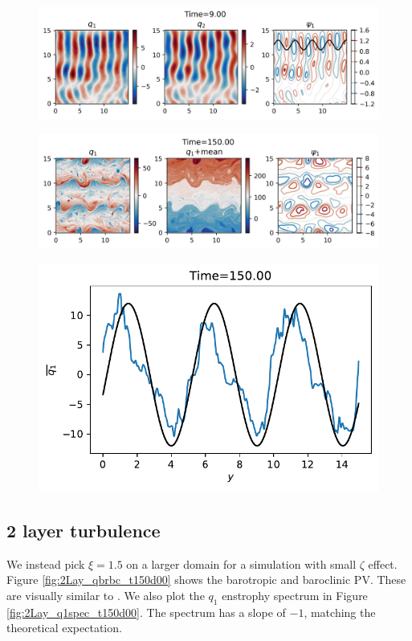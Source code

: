 \begin{figure}
    \centering
    \includegraphics[width=\textwidth]{2Layjets_q1_t9d00}
    \caption{}
    \label{fig:2Layjets_q1_t9d00}
\end{figure}


\begin{figure}
    \centering
    \includegraphics[width=\textwidth]{2Layjets_q1_t150d00}
    \caption{}
    \label{fig:2Layjets_q1_t150d00}
\end{figure}

\begin{figure}
    \centering
    \includegraphics{2Layjets_q1zonalmean_t150d00}
    \caption{}
    \label{fig:2Layjets_q1zonalmean_t150d00}
\end{figure}

\subsection{2 layer turbulence}
We instead pick $\xi=1.5$ on a larger domain for a simulation with small $\zeta$ effect. Figure \ref{fig:2Lay_qbrbc_t150d00} shows the barotropic and baroclinic PV. These are visually similar to \cite[Fig. 3]{LarichevHeld_95}. We also plot the $q_1$ enstrophy spectrum in Figure \ref{fig:2Lay_q1spec_t150d00}. The spectrum has a slope of $-1$, matching the theoretical expectation.


